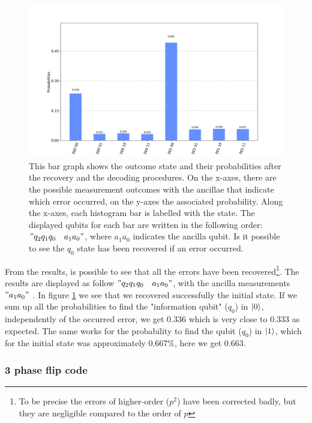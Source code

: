 \begin{figure}[h!]
    \includegraphics[width=\textwidth]{Mainmatter/images/outcome3bitflip.png}
    \caption{This bar graph shows the outcome state and their probabilities after the recovery and the decoding procedures. On the x-axes, there are the possible measurement outcomes with the ancillae that indicate which error occurred, on the y-axes the associated probability. Along the x-axes, each histogram bar is labelled with the state. The displayed qubits for each bar are written in the following order: $"q_2 q_1 q_0 \quad a_1a_0"$, where $a_1 a_0$ indicates the ancilla qubit. Is it possible to see the $q_0$ state has been recovered if an error occurred.}
    \label{fig:outcome_bitflipres}
\end{figure}
From the results, is possible to see that all the errors have been recovered\footnote{To be precise the errors of higher-order ($p^2$) have been corrected badly, but they are negligible compared to the order of $p$ }. The results are displayed as follow $"q_2 q_1 q_0 \quad a_1 a_0"$, with the ancilla measurements $"a_1 a_0"$ . In figure \ref{fig:outcome_bitflipres} we see that we recovered successfully the initial state. If we sum up all the probabilities to find the "information qubit" ($q_0$) in $\ket{0}$, independently of the occurred error, we get $0.336$ which is very close to $0.333$ as expected. The same works for the probability to find the qubit ($q_0$) in $\ket{1}$, which for the initial state was approximately $0.667\%$, here we get $0.663$. 



\newpage
\subsubsection*{3 phase flip code}

